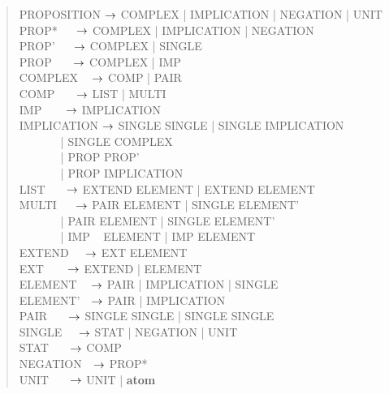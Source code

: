 \documentclass[a4]{article}
\begin{document}
\begin{quote}
\ttfamily
PROPOSITION $\rightarrow$ COMPLEX | IMPLICATION | NEGATION | UNIT\\
PROP* \(~~~~~~\)$\rightarrow$ COMPLEX | IMPLICATION | NEGATION\\
PROP' \(~~~~~~\)$\rightarrow$ COMPLEX | SINGLE\\
PROP \(~~~~~~~\)$\rightarrow$ COMPLEX | IMP\\
COMPLEX \(~~~~\)$\rightarrow$ COMP | PAIR\\
COMP \(~~~~~~~\)$\rightarrow$ LIST | MULTI\\
IMP \(~~~~~~~~\)$\rightarrow$ IMPLICATION\\
IMPLICATION $\rightarrow$ SINGLE  SINGLE
                    | SINGLE  IMPLICATION\\
\(~~~~~~~~~~~~~~~\) |
 SINGLE  COMPLEX\\
\(~~~~~~~~~~~~~~~\) |
 PROP  PROP'\\
\(~~~~~~~~~~~~~~~\) |
 PROP  
IMPLICATION\\
LIST \(~~~~~~~\)$\rightarrow$ EXTEND ELEMENT |
                      EXTEND ELEMENT\\
MULTI \(~~~~~~\)$\rightarrow$ PAIR \: ELEMENT |
                      SINGLE  ELEMENT'\\
\(~~~~~~~~~~~~~~~\) | PAIR  ELEMENT  |
                      SINGLE  ELEMENT'\\
\(~~~~~~~~~~~~~~~\) | IMP ~ ELEMENT  |
                      IMP  ELEMENT\\
EXTEND \(~~~~~\)$\rightarrow$ EXT\txt{,} ELEMENT\\
EXT \(~~~~~~~~\)$\rightarrow$ EXTEND | ELEMENT\\
ELEMENT \(~~~~\)$\rightarrow$ PAIR | IMPLICATION | SINGLE\\
ELEMENT' \(~~~\)$\rightarrow$ PAIR | IMPLICATION\\
PAIR \(~~~~~~~\)$\rightarrow$ SINGLE   SINGLE | SINGLE  SINGLE\\
SINGLE \(~~~~~\)$\rightarrow$ STAT | NEGATION | UNIT\\
STAT \(~~~~~~~\)$\rightarrow$ COMP\\
NEGATION \(~~~\)$\rightarrow$ PROP*\\
UNIT \(~~~~~~~\)$\rightarrow$ UNIT | {\bf atom}\\
\end{quote}
\end{document}
